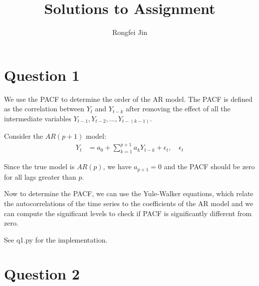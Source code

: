 \documentclass{article}
\title{Solutions to Assignment }
\author{Rongfei Jin}
\begin{document}
\pagestyle{fancy}
\fancyhf{}%
\fancyfoot[C]{\thepage}%
\maketitle

\section*{Question 1}

We use the PACF to determine the order of the AR model. The PACF is defined as the correlation between $Y_t$ and $Y_{t-k}$ after removing the effect of all the intermediate variables $Y_{t-1}, Y_{t-2}, \ldots, Y_{t-(k-1)}$.

Consider the \(AR(p+1)\) model:
\begin{align*} 
Y_t &= a_0 + \sum_{k=1}^{p+1} a_k Y_{t-k} + \epsilon_t, \quad \epsilon_t
\end{align*}

Since the true model is \(AR(p)\), we have \(a_{p+1} = 0\) and the PACF should be zero for all lags greater than \(p\).

Now to determine the PACF, we can use the Yule-Walker equations, which relate the autocorrelations of the time series to the coefficients of the AR model and we can compute the significant levels to check if PACF is significantly different from zero.

See q1.py for the implementation.
\section*{Question 2}
\end{document}

